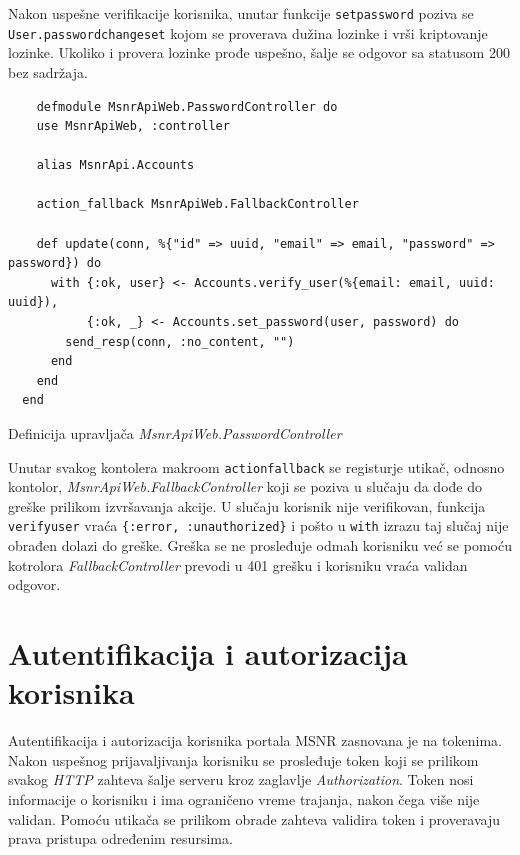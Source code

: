 \documentclass[12pt,oneside]{memoir}
\begin{document}
Nakon uspešne verifikacije korisnika, unutar funkcije \texttt{set{\textunderscore}password} poziva se
\texttt{User.password{\textunderscore}changeset} kojom se proverava dužina lozinke i vrši kriptovanje lozinke.
Ukoliko i provera lozinke prođe uspešno, šalje se odgovor sa statusom 200 bez sadržaja.

\begin{listing}[h!]
  \begin{verbatim}
    defmodule MsnrApiWeb.PasswordController do
    use MsnrApiWeb, :controller
  
    alias MsnrApi.Accounts
  
    action_fallback MsnrApiWeb.FallbackController
  
    def update(conn, %{"id" => uuid, "email" => email, "password" => password}) do
      with {:ok, user} <- Accounts.verify_user(%{email: email, uuid: uuid}),
           {:ok, _} <- Accounts.set_password(user, password) do
        send_resp(conn, :no_content, "")
      end
    end
  end
\end{verbatim}
\caption{Definicija upravljača \emph{MsnrApiWeb.PasswordController}}
\label{listing:password-controller}
\end{listing}

Unutar svakog kontolera makroom \texttt{action{\textunderscore}fallback} se registurje utikač, odnosno kontolor,
\emph{MsnrApiWeb.FallbackController} koji se poziva u slučaju da dođe do greške prilikom izvršavanja akcije.
U slučaju korisnik nije verifikovan, funkcija \texttt{verify{\textunderscore}user} vraća \texttt{\{:error, :unauthorized\}}
i pošto u \texttt{with} izrazu taj slučaj nije obrađen dolazi do greške. Greška se ne prosleđuje odmah korisniku već
se pomoću kotrolora \emph{FallbackController} prevodi u 401 grešku i korisniku vraća validan odgovor. 

\section{Autentifikacija i autorizacija korisnika}
Autentifikacija i autorizacija korisnika portala MSNR zasnovana je na tokenima. Nakon uspešnog prijavaljivanja korisniku
se prosleđuje token koji se prilikom svakog \emph{HTTP} zahteva šalje serveru kroz zaglavlje \emph{Authorization}.
Token nosi informacije o korisniku i ima ograničeno vreme trajanja, nakon čega više nije validan.
Pomoću utikača se prilikom obrade zahteva validira token i proveravaju prava pristupa određenim resursima.
\end{document}
